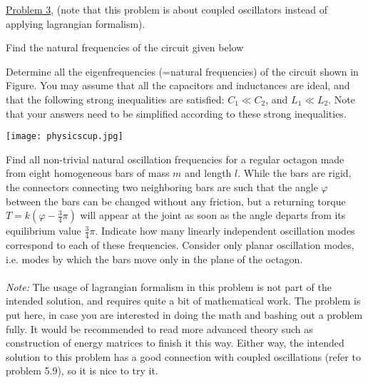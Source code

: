 \documentclass[11pt]{scrartcl}
\begin{document}
\begin{problem}[1986 IPhO]
\href{https://www.ioc.ee/~kree/students/iphoTable/files/ipho/1986_UnitedKingdom_p3.pdf}{Problem 3}, (note that this problem is about coupled oscillators instead of applying lagrangian formalism).
\end{problem}

\begin{problem}
Find the natural frequencies of the circuit given below 
\begin{center}
\end{center}
\end{problem}

\begin{problem}
Determine all the eigenfrequencies (=natural frequencies) of the circuit shown in Figure. You may assume that all the capacitors and inductances are ideal, and that the following strong inequalities are satisfied: $C_1 \ll C_2$, and $L_1 \ll L_2$. Note that your answers need to be simplified according to these strong inequalities.
\begin{center}
    \texttt{[image: physicscup.jpg]}
\end{center}
\end{problem}

\begin{problem}
Find all non-trivial natural oscillation frequencies for a regular octagon made from eight homogeneous bars of mass $m$ and length $l$. While the bars are rigid, the connectors connecting two neighboring bars are such that the angle $\varphi$ between the bars can be changed without any friction, but a returning torque $T = k\left(\varphi - \frac{3}{4}\pi\right)$ will appear at the joint as soon as the angle departs from its equilibrium value $\frac 34\pi$.  Indicate how many linearly independent oscillation modes correspond to each of these frequencies. Consider only planar oscillation modes, i.e. modes by which the bars move only in the plane of the octagon.
\\
\\
\textit{Note:} The usage of lagrangian formalism in this problem is not part of the intended solution, and requires quite a bit of mathematical work. The problem is put here, in case you are interested in doing the math and bashing out a problem fully. It would be recommended to read more advanced theory such as construction of energy matrices to finish it this way. Either way, the intended solution to this problem has a good connection with coupled oscillations (refer to problem 5.9), so it is nice to try it. 
\end{problem}
\newpage 
\end{document}

